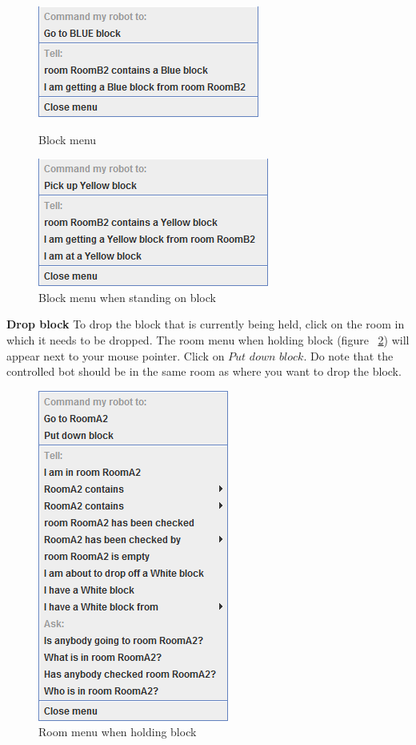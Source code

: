 \begin{figure}[h]
\centering
\begin{minipage}{0.5\textwidth}
\centering
  \includegraphics[width=.5\linewidth]{NewFeatures/hpg-block-menu1.png}
  \label{fig:blockMenu}
  \caption{Block menu}
\end{minipage}\hfill
\begin{minipage}{0.5\textwidth}
  \centering
  \includegraphics[width=.5\linewidth]{NewFeatures/hpg-block-menu2.png}
  \caption{Block menu when standing on block}
  \label{fig:blockMenu2}
\end{minipage}
\end{figure}
\raggedright{\textbf{Drop block}}
To drop the block that is currently being held, click on the room in which it needs to be dropped. The room menu when holding block (figure ~\ref{fig:roomMenu2}) will appear next to your mouse pointer. Click on $Put$ $down$ $block$. Do note that the controlled bot should be in the same room as where you want to drop the block.
\\
\begin{figure}[h]
\begin{center}
\includegraphics{NewFeatures/hpg-room-menu2.png}
\end{center}
\caption{Room menu when holding block}
\label{fig:roomMenu2}
\end{figure}
